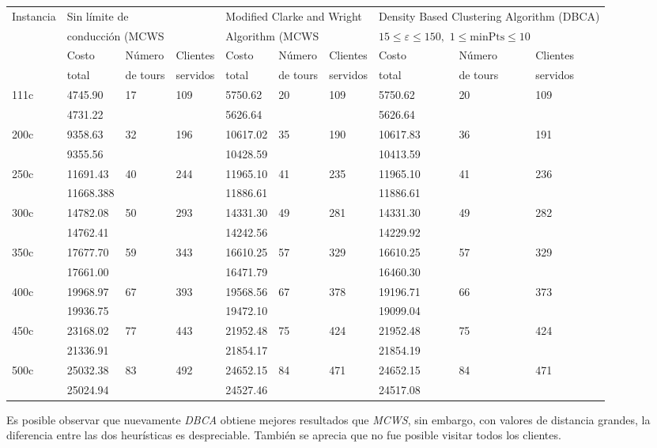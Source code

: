 \documentclass[letter, 10pt]{article}
\begin{document}
\begin{itemize}
\tiny
\begin{tabular}{|l|lll|lll|lll|}
\hline
Instancia & \multicolumn{3}{l|}{Sin límite de} 
		  & \multicolumn{3}{l|}{Modified Clarke and Wright}
		  & \multicolumn{3}{l|}{Density Based Clustering Algorithm (DBCA)} \\ 
		  & \multicolumn{3}{l|}{conducción (MCWS} 
		  & \multicolumn{3}{l|}{Algorithm (MCWS}
		  & \multicolumn{3}{l|}{ \(15 \leq \varepsilon \leq 150,\)  \(1 \leq \mbox{minPts} \leq 10\)} \\ \hline
		& Costo 	& Número 	& Clientes & Costo 	& Número 	& Clientes & Costo 	& Número 	& Clientes \\
		& total		& de tours 	& servidos & total	& de tours 	& servidos & total	& de tours 	& servidos\\ \hline
111c & 4745.90 & 17 & 109	& 5750.62 & 20  & 109 & 5750.62 & 20 & 109\\
	 & 4731.22 &	&		& 5626.64 &		& 	  & 5626.64 && \\ \hline
200c & 9358.63 & 32 & 196	&10617.02 &35   & 190 &10617.83 & 36 & 191\\
	 & 9355.56 &	&		&10428.59 &		& 	  &10413.59 && \\ \hline
250c &11691.43 & 40 & 244	&11965.10 & 41  & 235 &11965.10 & 41 & 236\\
	 &11668.388&	&		&11886.61 &		& 	  &11886.61 && \\ \hline
300c &14782.08 & 50 & 293	&14331.30 & 49  & 281 &14331.30 & 49 & 282\\
	 &14762.41 &	&		&14242.56 &		& 	  &14229.92 && \\ \hline
350c &17677.70 & 59 & 343	&16610.25 & 57  & 329 &16610.25 & 57 & 329\\
	 &17661.00 &	&		&16471.79 &		& 	  &16460.30 && \\ \hline
400c &19968.97 & 67 & 393	&19568.56 & 67  & 378 &19196.71 & 66 & 373\\
	 &19936.75 &	&		&19472.10 &		& 	  &19099.04 && \\ \hline
450c &23168.02 & 77 & 443	&21952.48 & 75  & 424 &21952.48 & 75 & 424\\
	 &21336.91 &	&		&21854.17 &		& 	  &21854.19 && \\ \hline
500c &25032.38 & 83 & 492	&24652.15 & 84  & 471 &24652.15 & 84 & 471\\
	 &25024.94 &	&		&24527.46 &		& 	  &24517.08 && \\ \hline	 	 	 	 	 	
\end{tabular}

\bigskip
\normalsize
Es posible observar que nuevamente \textit{DBCA} obtiene mejores resultados que \textit{MCWS}, sin embargo,
con valores de distancia grandes, la diferencia entre las dos heurísticas es despreciable. También se aprecia
que no fue posible visitar todos los clientes.

\end{itemize}
\end{document}
